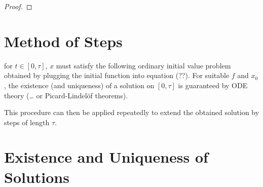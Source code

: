 \begin{proof}
\end{proof}


\section{Method of Steps}
    \label{sec:method-of-steps}
    
    for $t\in [0,\tau]$, $x$ must satisfy the following ordinary initial value problem obtained by plugging the initial function into equation (??). For suitable $f$ and $x_0$, the existence (and uniqueness) of a solution on $[0,\tau]$ is guaranteed by ODE theory (\ldots{} or Picard-Lindelöf theorems).

    This procedure can then be applied repeatedly to extend the obtained solution by steps of length $\tau$.





\section{Existence and Uniqueness of Solutions}
    \label{solutions-existence-uniqueness}

